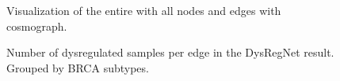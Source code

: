 \documentclass[pdftex,12pt,a4paper]{report}
\begin{document}
\begin{figure}[!ht]
\begin{center}
	\caption{Visualization of the entire with all nodes and edges with cosmograph\cite{cosmograph}.}
	\label{complete_network}
\end{center}
\end{figure}

\begin{figure}[!ht]
\begin{center}
	\caption{Number of dysregulated samples per edge in the DysRegNet result. Grouped by BRCA subtypes.}
	\label{samples_per_edge}
\end{center}
\end{figure}
\end{document}
